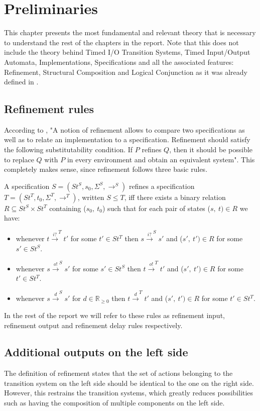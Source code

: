 \chapter{Preliminaries}\label{ch:preliminaries}
This chapter presents the most fundamental and relevant theory that is necessary to understand the rest of the chapters in the report. Note that this does not include the theory behind Timed I/O Transition Systems, Timed Input/Output Automata, Implementations, Specifications and all the associated features: Refinement, Structural Composition and Logical Conjunction as it was already defined in \textcite{Jecdar:2019}.

\section{Refinement rules}\label{sec:refRules}
According to \textcite{David:2010}, "A notion of refinement allows to compare two specifications as well as to relate an implementation to a specification. Refinement should satisfy the following substitutability condition. If $P$ refines $Q$, then it should be possible to replace $Q$ with $P$ in every environment and obtain an equivalent system". This completely makes sense, since refinement follows three basic rules.

A specification $S = (St^S, s_0, \Sigma^S ,\rightarrow^S)$ refines a specification \\ $T = (St^T, t_0, \Sigma^T ,\rightarrow^T)$, written $S \leq T$, iff there exists a binary relation $R \subseteq St^S \times St^T$ containing ($s_0,\ t_0$) such that for each pair of states ($s,\ t) \in R$ we have:
\begin{itemize}
    \item whenever $t \xrightarrow{i?}^T t'$ for some $t' \in St^T$ then $s \xrightarrow{i?}^S s'$ and ($s',\ t') \in R$ for some $s' \in St^S$.
    \item whenever $s \xrightarrow{o!}^S s'$ for some $s' \in St^S$ then $t \xrightarrow{o!}^T t'$ and ($s',\ t') \in R$ for some $t' \in St^T$.
    \item whenever $s \xrightarrow{d}^S s'$ for $d \in \mathbb{R}_{\geq 0}$ then $t \xrightarrow{d}^T t'$ and ($s',\ t') \in R$ for some $t' \in St^T$.
\end{itemize}
In the rest of the report we will refer to these rules as refinement input, refinement output and refinement delay rules respectively.

\section{Additional outputs on the left side}\label{sec:addOutputsLeft}
The definition of refinement states that the set of actions belonging to the transition system on the left side should be identical to the one on the right side. However, this restrains the transition systems, which greatly reduces possibilities such as having the composition of multiple components on the left side.


